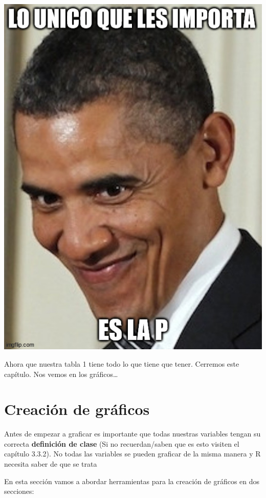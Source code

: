 \documentclass[
]{book}
\begin{document}
\includegraphics[width=6.94in]{img/pobama}

Ahora que nuestra tabla 1 tiene todo lo que tiene que tener. Cerremos este capítulo.
Nos vemos en los gráficos\ldots{}

\hypertarget{creaciuxf3n-de-gruxe1ficos}{%
\chapter{Creación de gráficos}\label{creaciuxf3n-de-gruxe1ficos}}

Antes de empezar a graficar es importante que todas nuestras variables tengan su correcta \textbf{definición de clase} (Si no recuerdan/saben que es esto visiten el capítulo 3.3.2). No todas las variables se pueden graficar de la misma manera y R necesita saber de que se trata

En esta sección vamos a abordar herramientas para la creación de gráficos en dos secciones:
\end{document}
